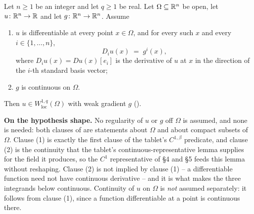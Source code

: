 \begin{lemma}
Let $n\ge1$ be an integer and let $q\ge1$ be real.  Let
$\Omega\subseteq\mathbb{R}^n$ be open, let $u\colon\mathbb{R}^n\to\mathbb{R}$ and let
$g\colon\mathbb{R}^n\to\mathbb{R}^n$.  Assume
\begin{enumerate}
\item $u$ is differentiable at every point $x\in\Omega$, and for every such $x$
  and every $i\in\{1,\dots,n\}$,
  \[
  D_iu(x)\;=\;g^i(x),
  \]
  where $D_iu(x)=Du(x)[e_i]$ is the derivative of $u$ at $x$ in the direction of
  the $i$-th standard basis vector;
\item $g$ is continuous on $\Omega$.
\end{enumerate}
Then $u\in W^{1,q}_{\mathrm{loc}}(\Omega)$ with weak gradient $g$
().

\noindent\textbf{On the hypothesis shape.}  No regularity of $u$ or $g$ off
$\Omega$ is assumed, and none is needed: both clauses of
 are statements about $\Omega$ and about compact subsets of
$\Omega$.  Clause (1) is exactly the first clause of the tablet's
$C^{1,\beta}$ predicate, and clause (2) is the continuity that the tablet's
continuous-representative lemma supplies for the field it produces, so the $C^1$ representative of \S4 and \S5
feeds this lemma without reshaping.  Clause (2) is not implied by clause (1) --
a differentiable function need not have continuous derivative -- and it is what
makes the three integrands below continuous.  Continuity of $u$ on $\Omega$ is
\emph{not} assumed separately: it follows from clause (1), since a function
differentiable at a point is continuous there.
\end{lemma}
